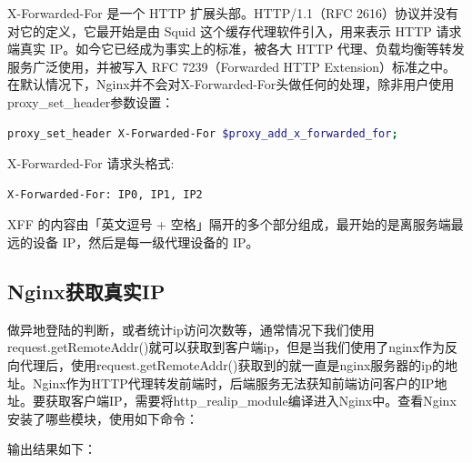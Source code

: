 \documentclass[letter]{book}
\begin{document}
X-Forwarded-For 是一个 HTTP 扩展头部。HTTP/1.1（RFC 2616）协议并没有对它的定义，它最开始是由 Squid 这个缓存代理软件引入，用来表示 HTTP 请求端真实 IP。如今它已经成为事实上的标准，被各大 HTTP 代理、负载均衡等转发服务广泛使用，并被写入 RFC 7239（Forwarded HTTP Extension）标准之中。在默认情况下，Nginx并不会对X-Forwarded-For头做任何的处理，除非用户使用proxy\_set\_header参数设置：

\begin{lstlisting}[language=bash]
proxy_set_header X-Forwarded-For $proxy_add_x_forwarded_for;
\end{lstlisting}

X-Forwarded-For 请求头格式:

\begin{lstlisting}[language=bash]
X-Forwarded-For: IP0, IP1, IP2
\end{lstlisting}

XFF 的内容由「英文逗号 + 空格」隔开的多个部分组成，最开始的是离服务端最远的设备 IP，然后是每一级代理设备的 IP。

\subsection{Nginx获取真实IP}

做异地登陆的判断，或者统计ip访问次数等，通常情况下我们使用request.getRemoteAddr()就可以获取到客户端ip，但是当我们使用了nginx作为反向代理后，使用request.getRemoteAddr()获取到的就一直是nginx服务器的ip的地址。Nginx作为HTTP代理转发前端时，后端服务无法获知前端访问客户的IP地址。要获取客户端IP，需要将http\_realip\_module编译进入Nginx中。查看Nginx安装了哪些模块，使用如下命令：



输出结果如下：
\end{document}

